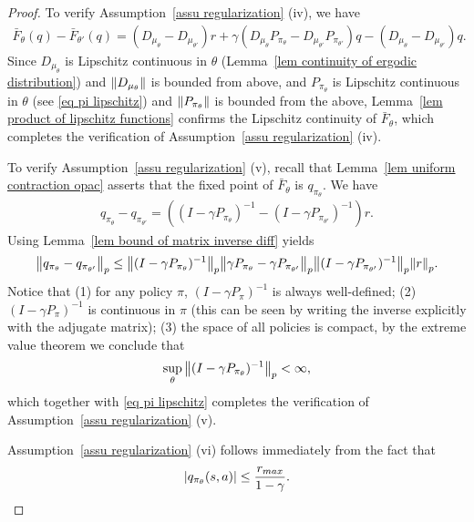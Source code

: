 \documentclass[twoside,11pt]{article}
\numberwithin{assucounter}{section}
\begin{document}
\begin{proof}
  To verify Assumption~\ref{assu regularization} (iv), 
  we have
  \begin{align}
    \bar F_\theta(q) - \bar F_{\theta'}(q)
    = \left(D_{\mu_\theta} - D_{\mu_{\theta'}}\right) r + \gamma \left(D_{\mu_\theta}P_{\pi_\theta} - D_{\mu_{\theta'} } P_{\pi_{\theta'}} \right) q- \left(D_{\mu_\theta} - D_{\mu_{\theta'}}\right) q .
  \end{align}
  Since $D_{\mu_\theta}$ is Lipschitz continuous in $\theta$ (Lemma~\ref{lem continuity of ergodic distribution}) and $\norm{D_{\mu_\theta}}$ is bounded from above,
  and $P_{\pi_\theta}$ is Lipschitz continuous in $\theta$ (see \eqref{eq pi lipschitz}) and $\norm{P_{\pi_\theta}}$ is bounded from the above,
  Lemma~\ref{lem product of lipschitz functions} confirms the Lipschitz continuity of $\bar F_\theta$,
  which completes the verification of Assumption~\ref{assu regularization} (iv).

  To verify Assumption~\ref{assu regularization} (v),
  recall that Lemma~\ref{lem uniform contraction opac} asserts that the fixed point of $\bar F_\theta$ is $q_{\pi_\theta}$.
  We have
  \begin{align}
    \label{eq lipschitz continuity of q}
    q_{\pi_\theta} - q_{\pi_{\theta'}} = \left((I - \gamma P_{\pi_\theta})^{-1} - (I - \gamma P_{\pi_{\theta'}})^{-1}\right) r.
  \end{align}
  Using Lemma~\ref{lem bound of matrix inverse diff} yields
  \begin{align}
    \norm{q_{\pi_\theta} - q_{\pi_{\theta'}}}_p \leq \norm{(I - \gamma P_{\pi_\theta})^{-1}}_p  \norm{\gamma P_{\pi_\theta} - \gamma P_{\pi_{\theta'}}}_p \norm{(I - \gamma P_{\pi_{\theta'}})^{-1}}_p \norm{r}_p.
  \end{align}
  Notice that 
  (1) for any policy $\pi$, $(I - \gamma P_\pi)^{-1}$ is always well-defined;
  (2) $(I - \gamma P_\pi)^{-1}$ is continuous in $\pi$ (this can be seen by writing the inverse explicitly with the adjugate matrix); (3) the space of all policies is compact,
  by the extreme value theorem we conclude that 
  \begin{align}
    \sup_{\theta} \norm{(I - \gamma P_{\pi_\theta})^{-1}}_p < \infty,
  \end{align}
  which together with \eqref{eq pi lipschitz} completes the verification of Assumption~\ref{assu regularization} (v).

  Assumption~\ref{assu regularization} (vi) follows immediately from the fact that
  \begin{align}
    \abs{q_{\pi_\theta}(s, a)} \leq \frac{r_{max}}{1 - \gamma}.
  \end{align}


\end{proof}
\end{document}
